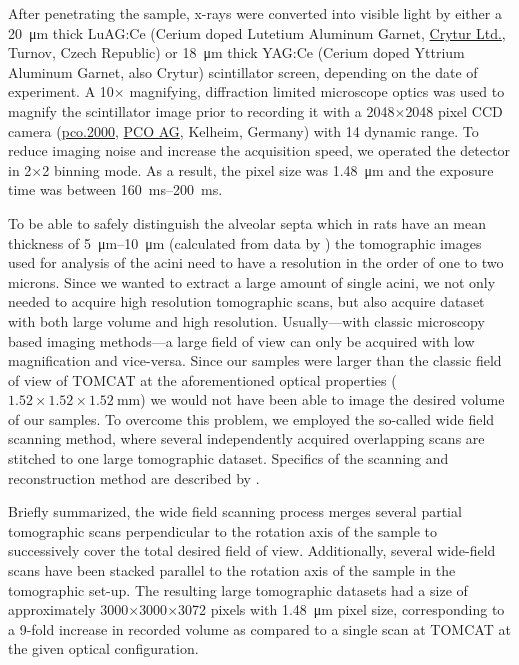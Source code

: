 \documentclass[a4paper,DIVcalc,abstract,english]{scrartcl}
\begin{document}
After penetrating the sample, x-rays were converted into visible light by either a \SI{20}{\micro\meter} thick LuAG:Ce (Cerium doped Lutetium Aluminum Garnet, \href{http://www.crytur.cz/}{Crytur Ltd.}, Turnov, Czech Republic) or \SI{18}{\micro\meter} thick YAG:Ce (Cerium doped Yttrium Aluminum Garnet, also Crytur) scintillator screen, depending on the date of experiment.
A 10\(\times\) magnifying, diffraction limited microscope optics was used to magnify the scintillator image prior to recording it with a 2048\(\times\)2048 pixel CCD camera (\href{http://www.pco.de/sensitive-cameras/pco2000/}{pco.2000}, \href{http://www.pco.de/}{PCO AG}, Kelheim, Germany) with \SI{14}{\bit} dynamic range.
To reduce imaging noise and increase the acquisition speed, we operated the detector in 2\(\times\)2 binning mode.
As a result, the pixel size was \SI{1.48}{\micro\meter} and the exposure time was between \SIrange{160}{200}{\milli\second}.

To be able to safely distinguish the alveolar septa which in rats have an mean thickness of \SIrange{5}{10}{\micro\meter} (calculated from data by \citet{Burri1974}) the tomographic images used for analysis of the acini need to have a resolution in the order of one to two microns.
Since we wanted to extract a large amount of single acini, we not only needed to acquire high resolution tomographic scans, but also acquire dataset with both large volume and high resolution.
Usually---with classic microscopy based imaging methods---a large field of view can only be acquired with low magnification and vice-versa.
Since our samples were larger than the classic field of view of TOMCAT at the aforementioned optical properties (\(1.52\times1.52\times\SI{1.52}{\milli\meter}\)) we would not have been able to image the desired volume of our samples.
To overcome this problem, we employed the so-called wide field scanning method, where several independently acquired overlapping scans are stitched to one large tomographic dataset.
Specifics of the scanning and reconstruction method are described by \citet{Haberthuer2010a}.

Briefly summarized, the wide field scanning process merges several partial tomographic scans perpendicular to the rotation axis of the sample to successively cover the total desired field of view.
Additionally, several wide-field scans have been stacked parallel to the rotation axis of the sample in the tomographic set-up.
The resulting large tomographic datasets had a size of approximately 3000\(\times\)3000\(\times\)3072 pixels with \SI{1.48}{\micro\meter} pixel size, corresponding to a 9-fold increase in recorded volume as compared to a single scan at TOMCAT at the given optical configuration.
\end{document}
